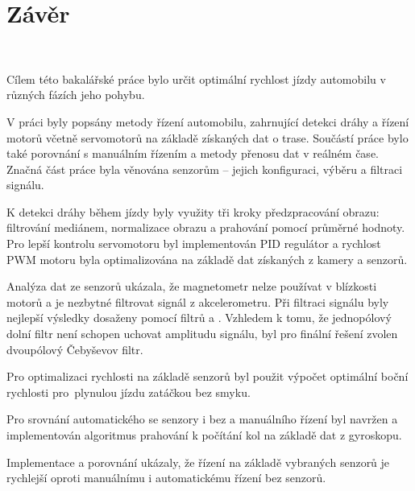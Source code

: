 \chapter{Závěr}
\label{sec:End}
\

Cílem této bakalářské práce bylo určit optimální rychlost jízdy automobilu v různých
fázích jeho pohybu.

V práci byly popsány metody řízení automobilu, zahrnující detekci dráhy a řízení
motorů včetně servomotorů na základě získaných dat o trase. Součástí práce bylo také
porovnání s manuálním řízením a metody přenosu dat v reálném čase. Značná část práce
byla věnována senzorům – jejich konfiguraci, výběru a filtraci signálu.

K detekci dráhy během jízdy byly využity tři kroky předzpracování obrazu: filtrování
mediánem, normalizace obrazu a prahování pomocí průměrné hodnoty. Pro lepší kontrolu
servomotoru byl implementován PID regulátor a rychlost PWM motoru byla optimalizována
na základě dat získaných z kamery a senzorů.

Analýza dat ze senzorů ukázala, že magnetometr nelze používat v blízkosti motorů a je
nezbytné filtrovat signál z akcelerometru. Při filtraci signálu byly nejlepší výsledky dosaženy
pomocí filtrů  a . Vzhledem k tomu,
že jednopólový dolní filtr není schopen uchovat amplitudu signálu, byl pro finální
řešení zvolen dvoupólový Čebyševov filtr.

Pro optimalizaci rychlosti na základě senzorů byl použit výpočet optimální boční
rychlosti pro~plynulou jízdu zatáčkou bez smyku.

Pro srovnání automatického se senzory i bez a manuálního řízení byl navržen a implementován algoritmus
prahování k počítání kol na základě dat z gyroskopu.

Implementace a porovnání ukázaly, že řízení na základě vybraných senzorů je rychlejší
oproti manuálnímu i automatickému řízení bez senzorů.

\endinput

